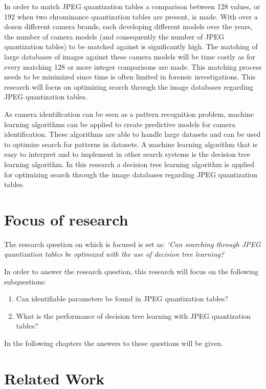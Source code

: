 In order to match JPEG quantization tables a comparison between 128 values, or 192 when two chrominance quantization tables are present, is made. With over a dozen different camera brands, each developing different models over the years, the number of camera models (and consequently the number of JPEG quantization tables) to be matched against is significantly high. The matching of large databases of images against these camera models will be time costly as for every matching 128 or more integer comparisons are made. This matching process needs to be minimized since time is often limited in forensic investigations. This research will focus on optimizing search through the image databases regarding JPEG quantization tables.

As camera identification can be seen as a pattern recognition problem\cite{luo2007survey}, machine learning algorithms can be applied to create predictive models for camera identification. These algorithms are able to handle large datasets and can be used to optimize search for patterns in datasets. A machine learning algorithm that is easy to interpret and to implement in other search systems is the decision tree learning algorithm. In this research a decision tree learning algorithm is applied for optimizing search through the image databases regarding JPEG quantization tables.


\section{Focus of research}
The research question on which is focused is set as: \textit{`Can searching through JPEG quantization tables be optimized with the use of decision tree learning?}

In order to answer the research question, this research will focus on the following subquestions:
\begin{enumerate}
\item Can identifiable parameters be found in JPEG quantization tables?
\item What is the performance of decision tree learning with JPEG quantization tables?
\end{enumerate}
In the following chapters the answers to these questions will be given.


\section{Related Work}

